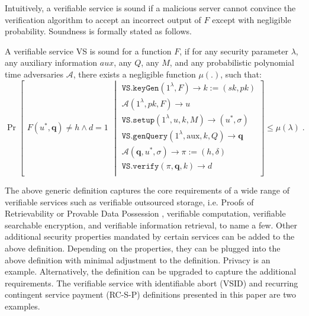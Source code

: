 Intuitively, a verifiable service is sound  if a malicious server cannot convince the verification algorithm to accept an incorrect output of $F$ except with negligible probability. %
Soundness is formally stated as follows.




\begin{definition}[VS Soundness] A verifiable service VS is sound  for a function $F$, if for  any security parameter $\lambda$, any auxiliary information $aux$, any  $Q$,  any $M$, and any probabilistic polynomial time adversaries $\mathcal{A}$, there exists a negligible function $\mu(.)$, such that: 
\small{
$$ \Pr\left[
  \begin{array}{l}
F(u^{\scriptscriptstyle *},\bm{q})\neq h \wedge d=1
\end{array} \middle | 
    \begin{array} {l}
 \mathtt{VS.keyGen}(1^{\lambda},F)\rightarrow k:=(sk,pk)\\
 \mathcal{A}(1^{\scriptscriptstyle\lambda},pk, F)\rightarrow u\\
\mathtt{VS.setup}(1^{\lambda}, u,k,M)\rightarrow (u^{\scriptscriptstyle *},\sigma)\\
 \mathtt{VS.genQuery}(1^{\lambda}, \text{aux},k,Q)\rightarrow \bm{q}\\
 \mathcal{A}(\bm{q},u^{\scriptscriptstyle *},\sigma)\rightarrow \pi:=(h,\delta)\\
 \mathtt{VS.verify}(\pi,\bm{q},k)\rightarrow d\\
\end{array}    \right]\leq \mu(\lambda)\;.$$
}
\end{definition}




The above generic definition captures the core requirements of a wide range of verifiable services such as verifiable outsourced storage, i.e. Proofs of Retrievability \cite{DBLP:journals/iacr/JuelsK07,DBLP:conf/asiacrypt/ShachamW08} or Provable Data Possession \cite{DBLP:conf/ccs/AtenieseBCHKPS07,ShenT11}, verifiable computation, verifiable searchable encryption, and verifiable information retrieval, to name a few. Other additional  security properties mandated by certain services can be added to the above definition. Depending on the properties,  they can be  plugged into  the above definition with minimal adjustment to the definition. Privacy is an example. Alternatively, the definition can be upgraded to capture the  additional requirements.  The verifiable service with identifiable abort (VSID) and recurring contingent service payment (RC-S-P) definitions presented in this paper are two examples. 


